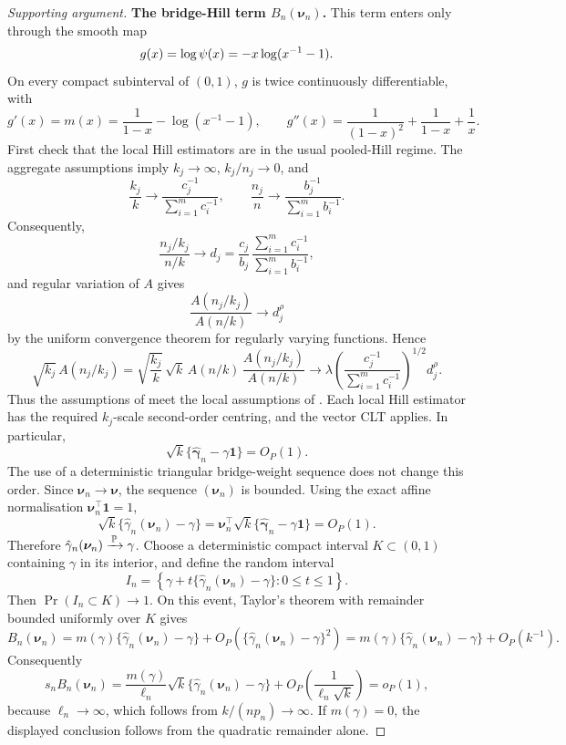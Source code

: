 \begin{proof}[Supporting argument]
\smallskip
\noindent\textbf{The bridge-Hill term \(B_n(\bm\nu_n)\).}
This term enters only through the smooth map
\[
  g(x)=\log\psi(x)=-x\log(x^{-1}-1).
\]
On every compact subinterval of \((0,1)\), \(g\) is twice continuously
differentiable, with
\[
  g'(x)=m(x)
  =
  \frac{1}{1-x}-\log(x^{-1}-1),
  \qquad
  g''(x)
  =
  \frac{1}{(1-x)^2}+\frac{1}{1-x}+\frac{1}{x}.
\]
First check that the local Hill estimators are in the usual pooled-Hill
regime. The aggregate assumptions imply \(k_j\to\infty\), \(k_j/n_j\to0\),
and
\[
  \frac{k_j}{k}\to
  \frac{c_j^{-1}}{\sum_{i=1}^{m}c_i^{-1}},
  \qquad
  \frac{n_j}{n}\to
  \frac{b_j^{-1}}{\sum_{i=1}^{m}b_i^{-1}}.
\]
Consequently,
\[
  \frac{n_j/k_j}{n/k}
  \to
  d_j
  =
  \frac{c_j}{b_j}\,
  \frac{\sum_{i=1}^{m}c_i^{-1}}{\sum_{i=1}^{m}b_i^{-1}},
\]
and regular variation of \(A\) gives
\[
  \frac{A(n_j/k_j)}{A(n/k)}\to d_j^\rho
\]
by the uniform convergence theorem for regularly varying functions. Hence
\[
  \sqrt{k_j}\,A(n_j/k_j)
  =
  \sqrt{\frac{k_j}{k}}\,
  \sqrt{k}\,A(n/k)\,
  \frac{A(n_j/k_j)}{A(n/k)}
  \to
  \lambda
  \left(\frac{c_j^{-1}}{\sum_{i=1}^{m} c_i^{-1}}\right)^{1/2}
  d_j^\rho .
\]
Thus the assumptions of  meet the local
assumptions of . Each local Hill estimator has the
required \(k_j\)-scale second-order centring, and the vector CLT applies. In
particular,
\[
  \sqrt{k}\{\hat{\bm\gamma}_n-\gamma\bm 1\}=O_P(1).
\]
The use of a deterministic triangular bridge-weight sequence does not change
this order. Since \(\bm\nu_n\to\bm\nu\), the sequence \((\bm\nu_n)\) is
bounded. Using the exact affine normalisation
\(\bm\nu_n^\top\bm 1=1\),
\[
  \sqrt{k}\{\hat\gamma_n(\bm\nu_n)-\gamma\}
  =
  \bm\nu_n^\top
  \sqrt{k}\{\hat{\bm\gamma}_n-\gamma\bm 1\}
  =
  O_P(1).
\]
Therefore \(\hat\gamma_n(\bm\nu_n)\xrightarrow{\,\operatorname{\mathbb{P}}\,}\gamma\). Choose a deterministic
compact interval \(K\subset(0,1)\) containing \(\gamma\) in its interior, and
define the random interval
\[
  I_n
  =
  \left\{
    \gamma+t\{\hat\gamma_n(\bm\nu_n)-\gamma\}:0\le t\le1
  \right\}.
\]
Then \(\Pr(I_n\subset K)\to1\). On this event, Taylor's theorem with remainder
bounded uniformly over \(K\) gives
\[
  B_n(\bm\nu_n)
  =
  m(\gamma)\{\hat\gamma_n(\bm\nu_n)-\gamma\}
  +
  O_P\!\left(\{\hat\gamma_n(\bm\nu_n)-\gamma\}^2\right)
  =
  m(\gamma)\{\hat\gamma_n(\bm\nu_n)-\gamma\}+O_P(k^{-1}).
\]
Consequently
\begin{equation}
\label{eq:pool-ext:B-negligible}
  s_n B_n(\bm\nu_n)
  =
  \frac{m(\gamma)}{\ell_n}
  \sqrt{k}\{\hat\gamma_n(\bm\nu_n)-\gamma\}
  +
  O_P\!\left(\frac{1}{\ell_n\sqrt{k}}\right)
  =
  o_P(1),
\end{equation}
because \(\ell_n\to\infty\), which follows from \(k/(np_n)\to\infty\). If
\(m(\gamma)=0\), the displayed conclusion follows from the quadratic remainder
alone.


\end{proof}
